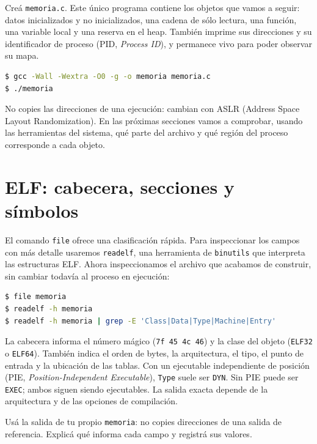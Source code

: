 \documentclass[11pt,a4paper]{article}
\newcommand{\inputcode}[2][]{%
  \par\addvspace{0.2\baselineskip}\noindent
  \begin{minipage}{\linewidth}
    
  \end{minipage}\par\addvspace{0.2\baselineskip}}
\begin{document}
Creá \texttt{memoria.c}. Este único programa contiene los objetos que vamos a
seguir: datos inicializados y no inicializados, una cadena de sólo lectura,
una función, una variable local y una reserva en el heap. También imprime sus
direcciones y su identificador de proceso (PID, \emph{Process ID}), y permanece
vivo para poder observar su mapa.

\inputcode[language=C,basicstyle=\ttfamily\footnotesize]{../examples/tp3/memoria.c}

\begin{lstlisting}[language=bash]
$ gcc -Wall -Wextra -O0 -g -o memoria memoria.c
$ ./memoria
\end{lstlisting}

No copies las direcciones de una ejecución: cambian con ASLR (Address Space
Layout Randomization). En las próximas secciones vamos a comprobar, usando
las herramientas del sistema, qué parte del archivo y qué región del proceso
corresponde a cada objeto.

\section{ELF: cabecera, secciones y símbolos}

El comando \texttt{file} ofrece una clasificación rápida. Para inspeccionar
los campos con más detalle usaremos \texttt{readelf}, una herramienta de
\texttt{binutils} que interpreta las estructuras ELF. Ahora inspeccionamos
el archivo que acabamos de construir, sin cambiar todavía al proceso en
ejecución:

\begin{lstlisting}[language=bash]
$ file memoria
$ readelf -h memoria
$ readelf -h memoria | grep -E 'Class|Data|Type|Machine|Entry'
\end{lstlisting}

La cabecera informa el número mágico (\texttt{7f 45 4c 46}) y la clase del
objeto (\texttt{ELF32} o \texttt{ELF64}). También indica el orden de bytes, la
arquitectura, el tipo, el punto de entrada y la ubicación de las tablas. Con un
ejecutable independiente de posición (PIE, \emph{Position-Independent
Executable}), \texttt{Type} suele ser \texttt{DYN}. Sin PIE puede ser
\texttt{EXEC}; ambos siguen siendo ejecutables. La salida exacta depende de
la arquitectura y de las opciones de compilación.

Usá la salida de tu propio \texttt{memoria}: no copies direcciones de una
salida de referencia. Explicá qué informa cada campo y registrá sus valores.
\end{document}
